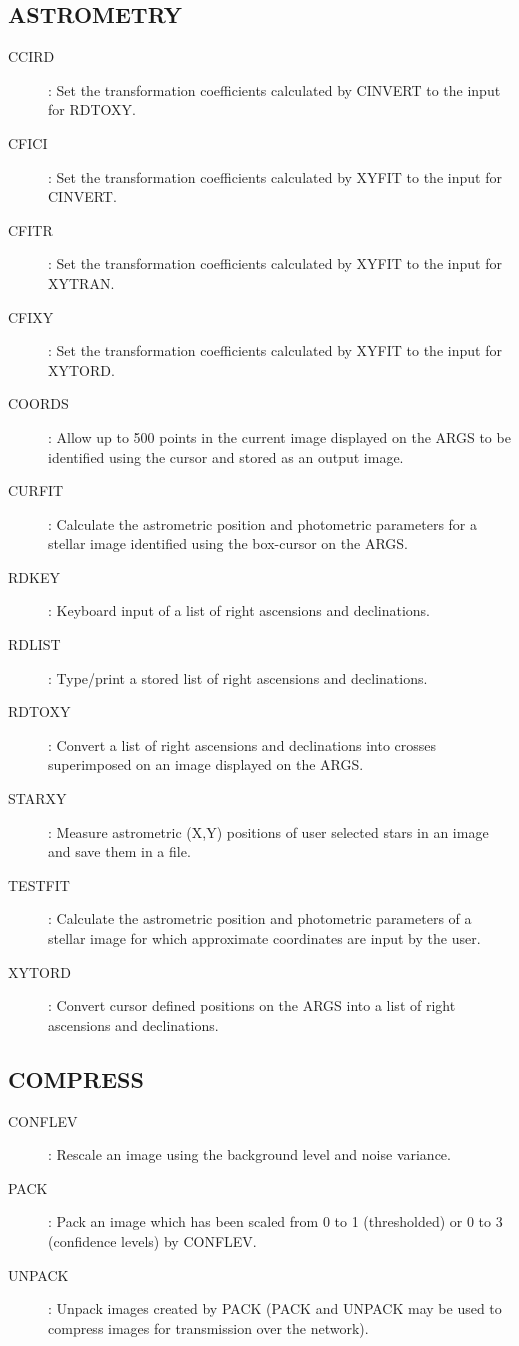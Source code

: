 \subsection {ASTROMETRY}
\begin{description}
\begin{description}
\item [CCIRD]: Set the transformation coefficients calculated by CINVERT to the
input for RDTOXY.
\item [CFICI]: Set the transformation coefficients calculated by XYFIT to the
input for CINVERT.
\item [CFITR]: Set the transformation coefficients calculated by XYFIT to the
input for XYTRAN.
\item [CFIXY]: Set the transformation coefficients calculated by XYFIT to the
input for XYTORD.
\item [COORDS]: Allow up to 500 points in the current image displayed on the
ARGS to be identified using the cursor and stored as an output image.
\item [CURFIT]: Calculate the astrometric position and photometric parameters
for a stellar image identified using the box-cursor on the ARGS.
\item [RDKEY]: Keyboard input of a list of right ascensions and declinations.
\item [RDLIST]: Type/print a stored list of right ascensions and declinations.
\item [RDTOXY]: Convert a list of right ascensions and declinations into crosses
superimposed on an image displayed on the ARGS.
\item [STARXY]: Measure astrometric (X,Y) positions of user selected stars in an
image and save them in a file.
\item [TESTFIT]: Calculate the astrometric position and photometric parameters
of a stellar image for which approximate coordinates are input by the user.
\item [XYTORD]: Convert cursor defined positions on the ARGS into a list of
right ascensions and declinations.
\end{description}
\end{description}
\subsection {COMPRESS}
\begin{description}
\begin{description}
\item [CONFLEV]: Rescale an image using the background level and noise variance.
\item [PACK]: Pack an image which has been scaled from 0 to 1 (thresholded) or
0 to 3 (confidence levels) by CONFLEV.
\item [UNPACK]: Unpack images created by PACK (PACK and UNPACK may be used to
compress images for transmission over the network).
\end{description}
\end{description}
